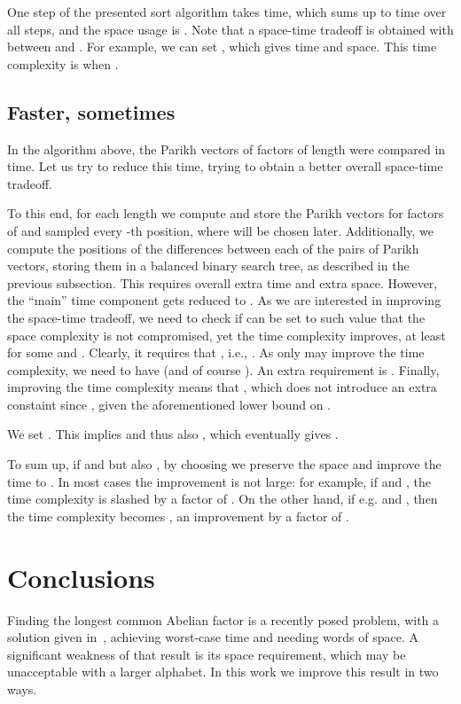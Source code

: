\documentclass{llncs}
\begin{document}
One step of the presented sort algorithm takes  time, 
which sums up to  time over all steps, 
and the space usage is .
Note that a space-time tradeoff is obtained with  between 
 and .
For example, we can set , which gives 
 time and  space.
This time complexity is  when .



\subsection{Faster, sometimes}
\noindent 
In the algorithm above, the Parikh vectors of factors 
of length  were compared in  time.
Let us try to reduce this time, trying to obtain a better 
overall space-time tradeoff.

To this end, for each length  
we compute and store the Parikh vectors for 
factors of  and  sampled every -th position, 
where  will be chosen later.
Additionally, we compute the positions of the differences between each of the 
 pairs of Parikh vectors, storing them in a 
balanced binary search tree, as described in the previous subsection.
This requires overall  extra time 
and  extra space.
However, the ``main'' time component gets reduced to 
.
As we are interested in improving the space-time tradeoff, 
we need to check if  can be set to such value that 
the space complexity is not compromised, yet the time complexity 
improves, at least for some  and .
Clearly, it requires that , i.e., 
.
As only  may improve the time complexity, 
we need to have  (and of course ).
An extra requirement is .
Finally, improving the time complexity means that 
, which does not introduce 
an extra constaint since , given 
the aforementioned lower bound on .

We set .
This implies  and thus also 
, which eventually gives 
.

To sum up, if  and 
 but also ,
by choosing 
we preserve the  space and improve the time 
to .
In most cases the improvement is not large: 
for example, if  and , 
the time complexity is slashed by a factor of .
On the other hand, if e.g.  
and , then the time complexity 
becomes , 
an improvement by a factor of .


\section{Conclusions}
\noindent 
Finding the longest common Abelian factor is a recently posed problem, 
with a solution given in~\cite{AILR2015}, 
achieving  worst-case time and 
needing  words of space.
A significant weakness of that result is its space requirement, 
which may be unacceptable with a larger alphabet.
In this work we improve this result in two ways.
\end{document}
